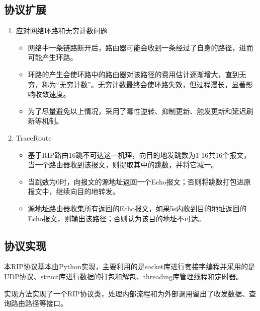 	\subsection{协议扩展} %
	\label{sub:协议扩展}
		\begin{enumerate}
			\item 应对网络环路和无穷计数问题
				\begin{itemize}
					\item 网络中一条链路断开后，路由器可能会收到一条经过了自身的路径，进而可能产生环路。
					\item 环路的产生会使环路中的路由器对该路径的费用估计逐渐增大，直到无穷，称为“无穷计数”。无穷计数最终会使环路失效，但过程漫长，显著影响收敛速度。
					\item 为了尽量避免以上情况，采用了毒性逆转、抑制更新、触发更新和延迟刷新等机制。
				\end{itemize}
			\item TraceRoute
				\begin{itemize}
					\item 基于RIP路由16跳不可达这一机理，向目的地发跳数为1-16共16个报文，当一个路由器收到该报文，则提取其中的跳数，并将它减一。
					\item 当跳数为0时，向报文的源地址返回一个Echo报文；否则将跳数打包进原报文中，继续向目的地转发。
					\item 源地址路由器收集所有返回的Echo报文，如果5s内收到目的地址返回的Echo报文，则输出该路径；否则认为该目的地址不可达。
				\end{itemize}
		\end{enumerate}
	\subsection{协议实现} %
	\label{sub:协议实现}
		本RIP协议基本由Python实现，主要利用的是socket库进行套接字编程并采用的是UDP协议、struct库进行数据的打包和解包、threading库管理线程和定时器。
		\par 实现方法实现了一个RIP协议类，处理内部流程和为外部调用留出了收发数据、查询路由路径等接口。
